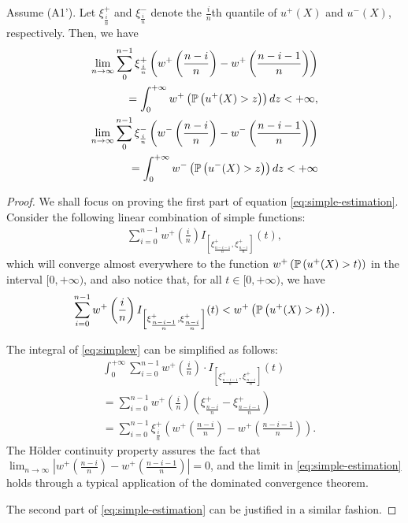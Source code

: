 \begin{proposition}
\label{prop:holder-quantile}
Assume (A1'). Let $\xi^+_{\frac{i}{n}}$ and $\xi^-_{\frac{i}{n}}$ denote the $\frac{i}{n}$th quantile of $u^+(X)$ and $u^-(X)$, respectively. Then, we have  
\begin{align}
\label{eq:simple-estimation}
\begin{split}
\lim_{n \rightarrow \infty} \sum_0^{n-1} \xi^+_{\frac{i}{n}} \left(w^+\left(\frac{n-i}{n}\right)- w^+\left(\frac{n-i-1}{n}\right) \right) \\
= \int_0^{+\infty} w^+\left(\mathbb{P}\left( u^+(X)>z \right)\right) dz < +\infty,
\\
\lim_{n \rightarrow \infty} \sum_0^{n-1} \xi^-_{\frac{i}{n}} \left(w^-\left(\frac{n-i}{n}\right)- w^-\left(\frac{n-i-1}{n}\right) \right) \\
= \int_0^{+\infty} w^-\left(\mathbb{P}\left( u^-(X)>z \right)\right) dz < +\infty
\end{split}
\end{align}
\end{proposition}


\begin{proof}
We shall focus on proving the first part of equation \eqref{eq:simple-estimation}. Consider the following linear combination of simple functions: 
\begin{align}
\sum_{i=0}^{n-1} w^+ \left(\frac{i}{n}\right) 
I_{\left[\xi^+_\frac{n-i-1}{n}, \xi^+_\frac{n-i}{n}\right]}(t),
\label{eq:simplew}
\end{align}
which will converge almost everywhere to the function $w^+\left(\mathbb{P}\left( u^{+}(X)>t \right)\right)$ in the interval $[0, +\infty)$, and also notice that, for all $t \in [0,+\infty)$, we have
\begin{align*}
\sum_{i=0}^{n-1} w^+ \left(\frac{i}{n}\right) 
I_{\left[\xi^+_\frac{n-i-1}{n}, \xi^+_\frac{n-i}{n}\right]}(t)
<
w^+\left(\mathbb{P}\left( u^{+}(X)>t \right)\right).
\end{align*}

The integral of \eqref{eq:simplew} can be simplified as follows:
\begin{align*}
& \int_0^{+\infty} \sum_{i=0}^{n-1} w^+ \left(\frac{i}{n}\right) 
\cdot I_{\left[\xi^+_\frac{n-i-1}{n}, \xi^+_\frac{n-i}{n}\right]}(t) \\
 & = \sum_{i=0}^{n-1} w^+\left(\frac{i}{n}\right) \left(\xi^+_{\frac{n-i}{n}} -
\xi^+_{\frac{n-i-1}{n}}\right) \\ & = \sum_{i=0}^{n-1} \xi^+_{\frac{i}{n}} \left(w^+\left(\frac{n-i}{n}\right)-
    w^+\left(\frac{n-i-1}{n}\right)\right).
\end{align*}
The H\"{o}lder continuity property assures the fact that 
$\lim_{n \rightarrow \infty}  | w^+(\frac{n-i}{n})- w^+(\frac{n-i-1}{n})| =0$, and the limit in \eqref{eq:simple-estimation} holds through a typical application of the dominated convergence theorem.

The second part of \eqref{eq:simple-estimation} can be justified in a similar fashion.
\end{proof} 

